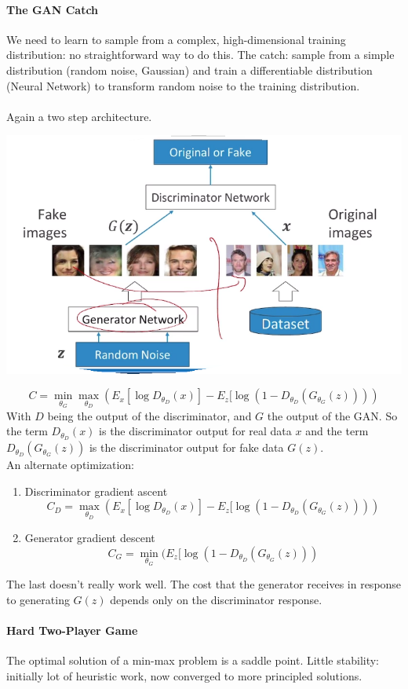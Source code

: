 \documentclass[10pt]{report}
\begin{document}
\paragraph{The GAN Catch} We need to learn to sample from a complex, high-dimensional training distribution: no straightforward way to do this. The catch: sample from a simple distribution (random noise, Gaussian) and train a differentiable distribution (Neural Network) to transform random noise to the training distribution.\\\\
Again a two step architecture.
\begin{center}
	\includegraphics[scale=0.5]{148.png}
\end{center}
$$C = \min_{\theta_G}\max_{\theta_D}\left(E_x[\log D_{\theta_D}(x)]-E_z[\log(1-D_{\theta_D}(G_{\theta_G}(z)))\right)$$
With $D$ being the output of the discriminator, and $G$ the output of the GAN. So the term $D_{\theta_D}(x)$ is the discriminator output for real data $x$ and the term $D_{\theta_D}(G_{\theta_G}(z))$ is the discriminator output for fake data $G(z)$.\\
An alternate optimization:\begin{enumerate}
\item Discriminator gradient ascent 
$$C_D = \max_{\theta_D}\left(E_x[\log D_{\theta_D}(x)]-E_z[\log(1-D_{\theta_D}(G_{\theta_G}(z)))\right)$$
\item Generator gradient descent
$$C_G =  \min_{\theta_G}(E_z[\log(1-D_{\theta_D}(G_{\theta_G}(z)))$$
\end{enumerate}
The last doesn't really work well. The cost that the generator receives in response to generating $G(z)$ depends only on the discriminator response.
\paragraph{Hard Two-Player Game} The optimal solution of a min-max problem is a saddle point. Little stability: initially lot of heuristic work, now converged to more principled solutions.
\end{document}
